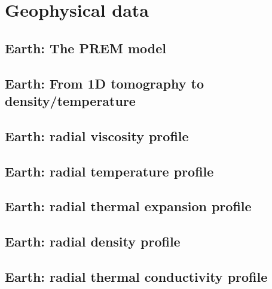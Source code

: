 \chapter{Geophysical data} 

\newpage %
\section{Earth: The PREM model} \label{ss:prem}  %
\newpage %
\section{Earth: From 1D tomography to density/temperature}  %
\newpage %
\section{Earth: radial viscosity profile \label{ss:viscprof}}  %
\newpage %
\section{Earth: radial temperature profile \label{ss:adiab}}  %
\newpage %
\section{Earth: radial thermal expansion profile}  %
\newpage %
\section{Earth: radial density profile}  %
\newpage %
\section{Earth: radial thermal conductivity profile}  %
\newpage %
